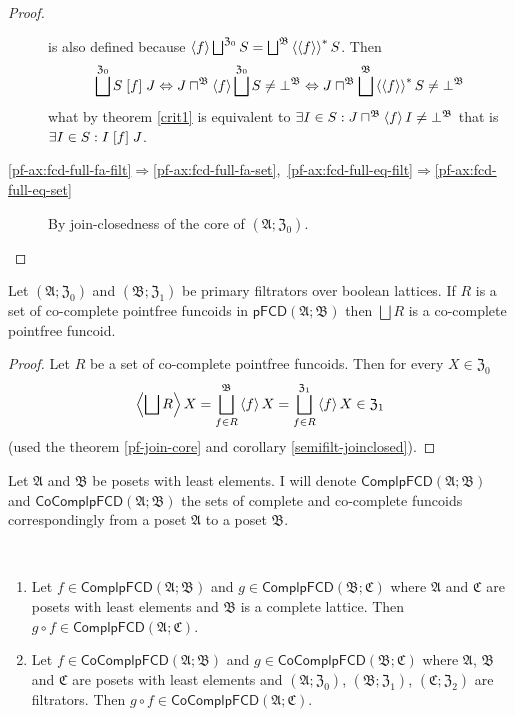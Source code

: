 \begin{proof}
\begin{description}
is also defined because $\left\langle f\right\rangle\bigsqcup^{\mathfrak{Z}_{0}}S=\bigsqcup^{\mathfrak{B}}\left\langle \left\langle f\right\rangle\right\rangle ^{\ast}S$.
Then
\[
\bigsqcup^{\mathfrak{Z}_{0}}S\mathrel{\left[f\right]}J\Leftrightarrow J\sqcap^{\mathfrak{B}}\left\langle f\right\rangle\bigsqcup^{\mathfrak{Z}_{0}}S\neq\bot^{\mathfrak{B}}\Leftrightarrow J\sqcap^{\mathfrak{B}}\bigsqcup^{\mathfrak{B}}\left\langle \left\langle f\right\rangle\right\rangle ^{\ast}S\neq\bot^{\mathfrak{B}}
\]
what by theorem \ref{crit1} is equivalent to $\exists I\in S:J\sqcap^{\mathfrak{B}}\left\langle f\right\rangle I\neq\bot^{\mathfrak{B}}$
that is $\exists I\in S:I\mathrel{\left[f\right]}J$.
\item [{\ref{pf-ax:fcd-full-fa-filt}$\Rightarrow$\ref{pf-ax:fcd-full-fa-set},~\ref{pf-ax:fcd-full-eq-filt}$\Rightarrow$\ref{pf-ax:fcd-full-eq-set}}] By
join-closedness of the core of $(\mathfrak{A};\mathfrak{Z}_{0})$.
\end{description}
\end{proof}
\begin{thm}
\label{pf-join-cocompl}Let $(\mathfrak{A};\mathfrak{Z}_{0})$ and
$(\mathfrak{B};\mathfrak{Z}_{1})$ be primary filtrators over boolean
lattices. If $R$ is a set of co-complete pointfree funcoids in $\mathsf{pFCD}(\mathfrak{A};\mathfrak{B})$
then $\bigsqcup R$ is a co-complete pointfree funcoid.\end{thm}
\begin{proof}
Let $R$ be a set of co-complete pointfree funcoids. Then for every
$X\in\mathfrak{Z}_{0}$
\[
\left\langle \bigsqcup R\right\rangle X=\bigsqcup_{f\in R}^{\mathfrak{B}}\left\langle f\right\rangle X=\bigsqcup_{f\in R}^{\mathfrak{Z}_{1}}\left\langle f\right\rangle X\in\mathfrak{Z}_{1}
\]
(used the theorem \ref{pf-join-core} and corollary \ref{semifilt-joinclosed}).
\end{proof}
Let $\mathfrak{A}$ and $\mathfrak{B}$ be posets with least elements.
I will denote $\mathsf{ComplpFCD}(\mathfrak{A};\mathfrak{B})$ and
$\mathsf{CoComplpFCD}(\mathfrak{A};\mathfrak{B})$ the sets of complete
and co-complete funcoids correspondingly from a poset $\mathfrak{A}$
to a poset $\mathfrak{B}$.
\begin{prop}
~
\begin{enumerate}
\item \label{pf-compl-comp}Let $f\in\mathsf{ComplpFCD}(\mathfrak{A};\mathfrak{B})$
and $g\in\mathsf{ComplpFCD}(\mathfrak{B};\mathfrak{C})$ where $\mathfrak{A}$
and $\mathfrak{C}$ are posets with least elements and $\mathfrak{B}$
is a complete lattice. Then $g\circ f\in\mathsf{ComplpFCD}(\mathfrak{A};\mathfrak{C})$.
\item \label{pf-cocompl-comp}Let $f\in\mathsf{CoComplpFCD}(\mathfrak{A};\mathfrak{B})$
and $g\in\mathsf{CoComplpFCD}(\mathfrak{B};\mathfrak{C})$ where $\mathfrak{A}$,
$\mathfrak{B}$ and $\mathfrak{C}$ are posets with least elements
and $(\mathfrak{A};\mathfrak{Z}_{0})$, $(\mathfrak{B};\mathfrak{Z}_{1})$,
$(\mathfrak{C};\mathfrak{Z}_{2})$ are filtrators. Then $g\circ f\in\mathsf{CoComplpFCD}(\mathfrak{A};\mathfrak{C})$.
\end{enumerate}
\end{prop}
